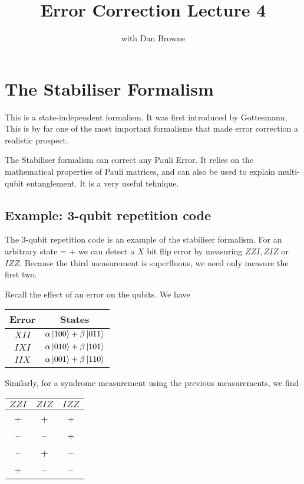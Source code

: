 


\title{Error Correction Lecture 4}
\author{with Dan Browne}
\maketitle
\tableofcontents
\section{The Stabiliser Formalism}
This is a state-independent formalism. It was first introduced by Gottesmann, This is by far one of the most important formalisms that made error correction a realistic prospect. 

The Stabiliser formalism can correct any Pauli Error. It relies on the mathematical properties of Pauli matrices, and can also be used to explain multi-qubit entanglement. It is a very useful tehnique. 

\subsection{Example: 3-qubit repetition code}

The 3-qubit repetition code is an example of the stabiliser formalism. For an arbitrary state
\beq
\ket{\psi} = \alpha {} + \beta {}
\eeq
we can detect a $X$ bit flip error by measuring $ZZI, ZIZ$ or $IZZ$. Because the third measurement is superfluous, we need only measure the first two. 

Recall the effect of an error on the qubits. We have

\begin{tabular} {cc}
Error & States \\ \hline
$XII$ & $\alpha \ket{100} + \beta\ket{011}$ \\
$IXI$ & $\alpha \ket{010} + \beta \ket{101}$ \\
$IIX$ & $\alpha \ket{001} + \beta \ket{110}$
\end{tabular}

Similarly, for a syndrome measurement using the previous measurements, we find

\begin{tabular}{ccc}
$ZZI$ & $ZIZ$ & $IZZ$ \\ \hline
+ & + & + \\
-- & -- & + \\
-- & + & -- \\
+ & -- & --
\end{tabular}

